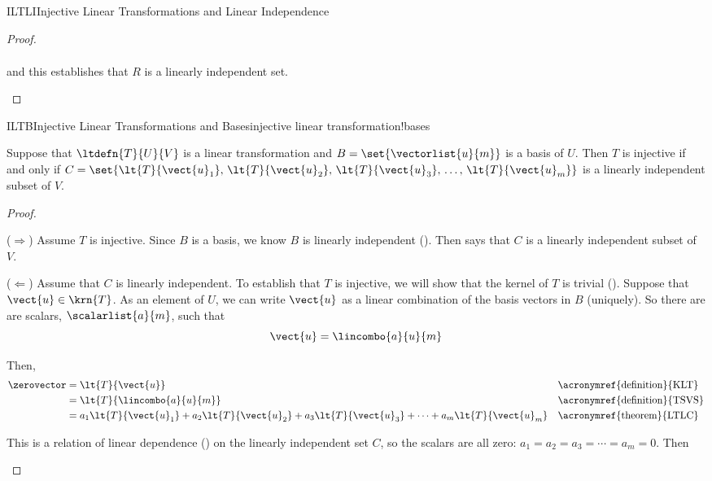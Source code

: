 \begin{subsect}{ILTLI}{Injective Linear Transformations and Linear Independence}
\begin{proof}
\begin{para}
\begin{align*}
\end{align*}
%
and this establishes that $R$ is a linearly independent set.\end{para}
%
\end{proof}
%
\begin{theorem}{ILTB}{Injective Linear Transformations and Bases}{injective linear transformation!bases}
\begin{para}Suppose that $\ltdefn{T}{U}{V}$ is a linear transformation and $B=\set{\vectorlist{u}{m}}$ is a basis of $U$.  Then $T$ is injective if and only if $C=\set{\lt{T}{\vect{u}_1},\,\lt{T}{\vect{u}_2},\,\lt{T}{\vect{u}_3},\,\ldots,\,\lt{T}{\vect{u}_m}}$ is a linearly independent subset of $V$.\end{para}
\end{theorem}
%
\begin{proof}
%
\begin{para}($\Rightarrow$)  Assume $T$ is injective.  Since $B$ is a basis, we know $B$ is linearly independent ().  Then  says that $C$ is a linearly independent subset of $V$.\end{para}
%
\begin{para}($\Leftarrow$)  Assume that $C$ is linearly independent.  To establish that $T$ is injective, we will show that the kernel of $T$ is trivial ().  Suppose that $\vect{u}\in\krn{T}$.  As an element of $U$, we can write $\vect{u}$ as a linear combination of the basis vectors in $B$ (uniquely).  So there are are scalars, $\scalarlist{a}{m}$, such that
%
\begin{equation*}
\vect{u}=\lincombo{a}{u}{m}
\end{equation*}
\end{para}
%
\begin{para}Then,
%
\begin{align*}
\zerovector
&=\lt{T}{\vect{u}}
&&\text{\acronymref{definition}{KLT}}\\
%
&=\lt{T}{\lincombo{a}{u}{m}}
&&\text{\acronymref{definition}{TSVS}}\\
%
&=a_1\lt{T}{\vect{u}_1}+a_2\lt{T}{\vect{u}_2}+a_3\lt{T}{\vect{u}_3}+\cdots+a_m\lt{T}{\vect{u}_m}
&&\text{\acronymref{theorem}{LTLC}}
%
\end{align*}
\end{para}
%
\begin{para}This is a relation of linear dependence () on the linearly independent set $C$, so the scalars are all zero:  $a_1=a_2=a_3=\cdots=a_m=0$.  Then

\end{para}
\end{proof}
\end{subsect}
